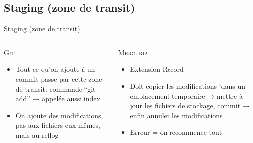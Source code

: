 \subsection{Staging (zone de transit)}
\begin{frame}{Staging (zone de transit)}
  \begin{columns}[T]

    \begin{column}{.5\textwidth}
      \textsc{Git}
      \begin{itemize}
        \item{Tout ce qu’on ajoute à un commit passe par cette zone de transit:
              commande “git add” → appelée aussi index}
        \item{On ajoute des modifications, pas aux fichiers eux-mêmes,
              mais au reflog}
      \end{itemize}
    \end{column}

    \begin{column}{.5\textwidth}
      \textsc{Mercurial}
      \begin{itemize}
        \item{Extension Record}
        \item{Doit copier les modifications ‘dans un emplacement temporaire →
              mettre à jour les fichiers de stockage, commit → enfin annuler
              les modifications}
        \item{Erreur = on recommence tout}
      \end{itemize}
    \end{column}

  \end{columns}
\end{frame}
